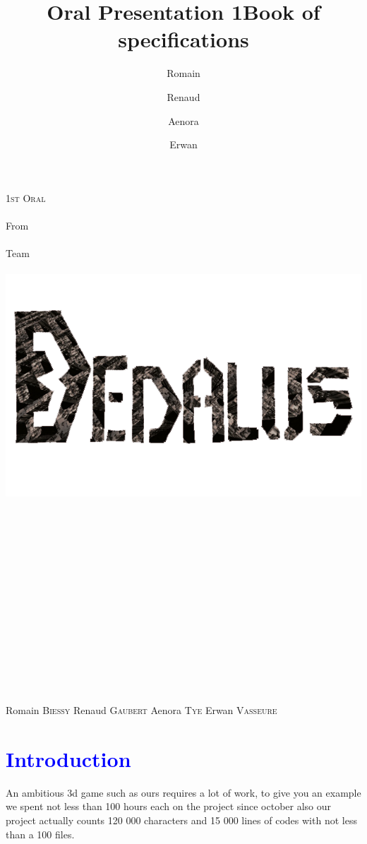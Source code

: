 \documentclass[article]{report} %
\title {Oral Presentation 1}
\title {Book of specifications}
\author {Romain\and Renaud\and Aenora\and Erwan}
\date {}
\begin{document}
		\thispagestyle{empty}
  			\begin{titlepage} 
						\vspace*{1cm} 
  					\begin{center} 
  							{\huge{\textsc{1st Oral} \\ ~ \\{\large From}\\ ~\\ Team \\  ~ \\ }}
	  						\includegraphics[width = 14cm]{Images/Dedalus.png}
							\\ ~ \\ ~ \\ ~ \\ ~ \\ ~ \\ ~ \\ ~ \\ ~ \\ ~ \\ ~ \\ ~ \\ ~ \\ ~ \\ ~ 
						\end{center}
  					\hfill {\large Romain \textsc{Biessy}}
  					\hfill {\large Renaud \textsc{Gaubert}}
  					\hfill {\large Aenora \textsc{Tye}}
  					\hfill {\large Erwan  \textsc{Vasseure}}
  			\end{titlepage} 

  	\tableofcontents
  		\newpage
		
		\chapter{\textcolor{blue}{Introduction}}
 			An ambitious 3d game such as ours requires a lot of work, to give you an example we spent not less than 100 hours each on the project since october also our project actually counts 120 000 characters and 15 000 lines of codes with not less than a 100 files.
\end{document}
